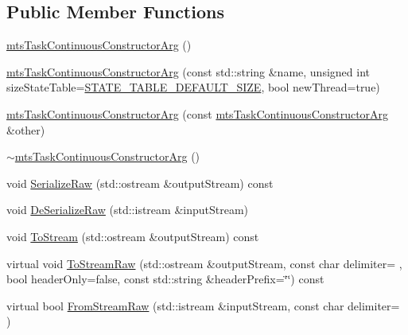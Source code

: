 \subsection*{Public Member Functions}
\begin{DoxyCompactItemize}
\item 
\hyperlink{classmts_task_continuous_constructor_arg_a44e7185a59526b7714965531eab9df14}{mts\+Task\+Continuous\+Constructor\+Arg} ()
\item 
\hyperlink{classmts_task_continuous_constructor_arg_ad2d6060a83c443b8121cda6e2103527c}{mts\+Task\+Continuous\+Constructor\+Arg} (const std\+::string \&name, unsigned int size\+State\+Table=\hyperlink{classmts_task_continuous_constructor_arg_a45f2bdbbc5675e56493c3ae482366eb2aa445b554da5472573538670101b0cc34}{S\+T\+A\+T\+E\+\_\+\+T\+A\+B\+L\+E\+\_\+\+D\+E\+F\+A\+U\+L\+T\+\_\+\+S\+I\+Z\+E}, bool new\+Thread=true)
\item 
\hyperlink{classmts_task_continuous_constructor_arg_a0941d5f66ab4cf88cfd864072ab92915}{mts\+Task\+Continuous\+Constructor\+Arg} (const \hyperlink{classmts_task_continuous_constructor_arg}{mts\+Task\+Continuous\+Constructor\+Arg} \&other)
\item 
\hyperlink{classmts_task_continuous_constructor_arg_a1e7e13d3202fe4186593d3699da1ff19}{$\sim$mts\+Task\+Continuous\+Constructor\+Arg} ()
\item 
void \hyperlink{classmts_task_continuous_constructor_arg_a271a5c201277963352d7e3e9dee08195}{Serialize\+Raw} (std\+::ostream \&output\+Stream) const 
\item 
void \hyperlink{classmts_task_continuous_constructor_arg_a75f78176e26f781eecbb0caf50ce40a6}{De\+Serialize\+Raw} (std\+::istream \&input\+Stream)
\item 
void \hyperlink{classmts_task_continuous_constructor_arg_adea556a3b4295fe124170b31c5c00a41}{To\+Stream} (std\+::ostream \&output\+Stream) const 
\item 
virtual void \hyperlink{classmts_task_continuous_constructor_arg_a2cdec03572448b0e6783ca3c07bf3b93}{To\+Stream\+Raw} (std\+::ostream \&output\+Stream, const char delimiter= \textquotesingle{} \textquotesingle{}, bool header\+Only=false, const std\+::string \&header\+Prefix=\char`\"{}\char`\"{}) const 
\item 
virtual bool \hyperlink{classmts_task_continuous_constructor_arg_ae323bc20dc5d38d1d98a3abf2f6d5465}{From\+Stream\+Raw} (std\+::istream \&input\+Stream, const char delimiter= \textquotesingle{} \textquotesingle{})
\end{DoxyCompactItemize}
